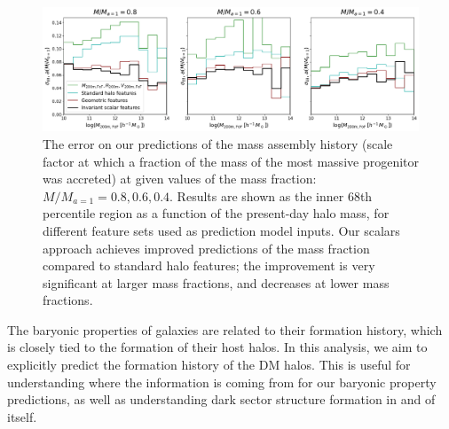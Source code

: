 \begin{figure}
    \centering
    \includegraphics[width=\textwidth]{pred_amfracs_multi.png}
    \caption{The error on our predictions of the mass assembly history (scale factor at which a fraction of the mass of the most massive progenitor was accreted) at given values of the mass fraction: $M/M_{a=1} = 0.8, 0.6, 0.4$. Results are shown as the inner 68th percentile region as a function of the present-day halo mass, for different feature sets used as prediction model inputs. Our scalars approach achieves improved predictions of the mass fraction compared to standard halo features; the improvement is very significant at larger mass fractions, and decreases at lower mass fractions.}
    \label{fig:pred_amfracs}
\end{figure}

The baryonic properties of galaxies are related to their formation history, which is closely tied to the formation of their host halos.
In this analysis, we aim to explicitly predict the formation history of the DM halos.
This is useful for understanding where the information is coming from for our baryonic property predictions, as well as understanding dark sector structure formation in and of itself.

